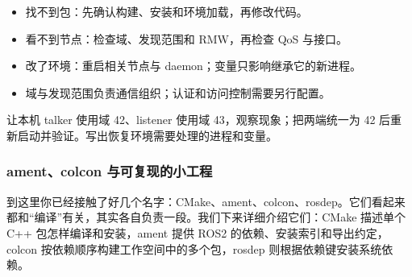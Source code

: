 \begin{conclusion}
\begin{itemize}
\item 找不到包：先确认构建、安装和环境加载，再修改代码。
\item 看不到节点：检查域、发现范围和 RMW，再检查 QoS 与接口。
\item 改了环境：重启相关节点与 daemon；变量只影响继承它的新进程。
\item 域与发现范围负责通信组织；认证和访问控制需要另行配置。
\end{itemize}
\end{conclusion}

\begin{exercise}
\label{ex:v2-ros-domain}
让本机 talker 使用域 42、listener 使用域 43，观察现象；把两端统一为 42 后重新启动并验证。写出恢复环境需要处理的进程和变量。
\end{exercise}

\subsubsection{ament、colcon 与可复现的小工程}
\label{sec:ros2-ament}

到这里你已经接触了好几个名字：CMake、ament、colcon、rosdep。它们看起来都和“编译”有关，其实各自负责一段。我们下来详细介绍它们：CMake 描述单个 C++ 包怎样编译和安装，ament 提供 ROS2 的依赖、安装索引和导出约定，colcon 按依赖顺序构建工作空间中的多个包，rosdep 则根据依赖键安装系统依赖。

